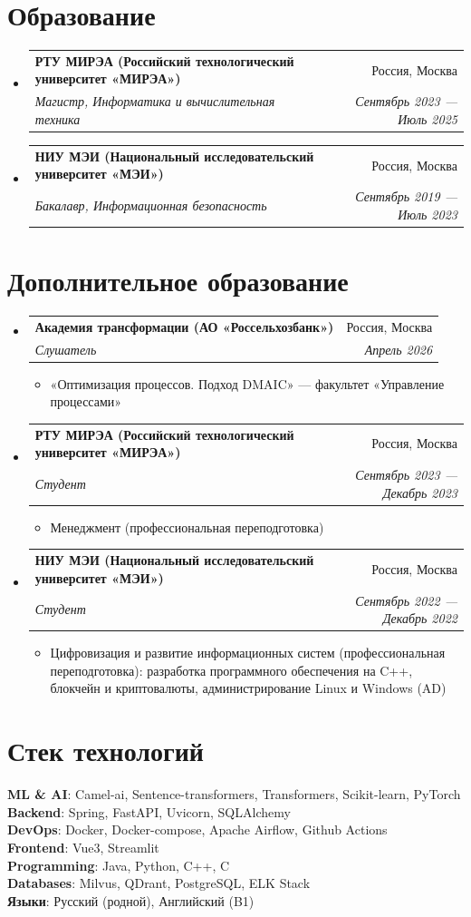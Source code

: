 \documentclass[letterpaper,11pt]{article}
\makeatletter
\newcommand{\resumeItem}[1]{
  \item\small{
    {#1 \vspace{-2pt}}
  }
}
\newcommand{\resumeSubheading}[4]{
  \vspace{-2pt}\item
    \begin{tabular*}{0.97\textwidth}[t]{l@{\extracolsep{\fill}}r}
      \textbf{#1} & #2 \\
      \textit{\small#3} & \textit{\small #4} \\
    \end{tabular*}\vspace{-7pt}
}
\newcommand{\resumeSubHeadingListStart}{\begin{itemize}[leftmargin=0.15in, label={}]}
\newcommand{\resumeSubHeadingListEnd}{\end{itemize}}
\newcommand{\resumeItemListStart}{\begin{itemize}}
\newcommand{\resumeItemListEnd}{\end{itemize}\vspace{-5pt}}
\makeatother
\begin{document}
\section{Образование}
  \resumeSubHeadingListStart
    \resumeSubheading
      {РТУ МИРЭА (Российский технологический университет «МИРЭА»)}{Россия, Москва}
      {Магистр, Информатика и вычислительная техника}{Сентябрь 2023 --- Июль 2025}
    \resumeSubheading
      {НИУ МЭИ (Национальный исследовательский университет «МЭИ»)}{Россия, Москва}
      {Бакалавр, Информационная безопасность}{Сентябрь 2019 --- Июль 2023}
  \resumeSubHeadingListEnd


\section{Дополнительное образование}
  \resumeSubHeadingListStart
    \resumeSubheading
      {Академия трансформации (АО «Россельхозбанк»)}{Россия, Москва}
      {Слушатель}{Апрель 2026}
      \resumeItemListStart
        \resumeItem{«Оптимизация процессов. Подход DMAIC» --- факультет «Управление процессами»}
      \resumeItemListEnd
    \resumeSubheading
      {РТУ МИРЭА (Российский технологический университет «МИРЭА»)}{Россия, Москва}
      {Студент}{Сентябрь 2023 --- Декабрь 2023}
      \resumeItemListStart
        \resumeItem{Менеджмент (профессиональная переподготовка)}
      \resumeItemListEnd
    \resumeSubheading
      {НИУ МЭИ (Национальный исследовательский университет «МЭИ»)}{Россия, Москва}
      {Студент}{Сентябрь 2022 --- Декабрь 2022}
      \resumeItemListStart
        \resumeItem{Цифровизация и развитие информационных систем (профессиональная переподготовка): разработка программного обеспечения на C++, блокчейн и криптовалюты, администрирование Linux и Windows (AD)}
      \resumeItemListEnd
  \resumeSubHeadingListEnd


\section{Стек технологий}
 \begin{itemize}[leftmargin=0.15in, label={}]
    \small{\item{
     \textbf{ML \& AI}{: Camel-ai, Sentence-transformers, Transformers, Scikit-learn, PyTorch} \\
     \textbf{Backend}{: Spring, FastAPI, Uvicorn, SQLAlchemy} \\
     \textbf{DevOps}{: Docker, Docker-compose, Apache Airflow, Github Actions} \\
     \textbf{Frontend}{: Vue3, Streamlit} \\
     \textbf{Programming}{: Java, Python, C++, C} \\
     \textbf{Databases}{: Milvus, QDrant, PostgreSQL, ELK Stack} \\
     \textbf{Языки}{: Русский (родной), Английский (B1)}
    }}
 \end{itemize}


\end{document}

